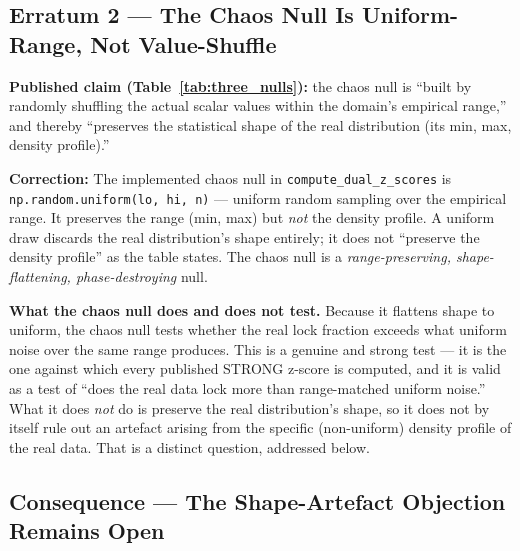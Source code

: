 \documentclass[11pt, letterpaper, openany]{book}
\begin{document}
\subsection*{Erratum 2 --- The Chaos Null Is Uniform-Range, Not Value-Shuffle}
 
\begin{warningbox}
\textbf{Published claim (Table~\ref{tab:three_nulls}):} the chaos null is ``built by
randomly shuffling the actual scalar values within the domain's empirical range,''
and thereby ``preserves the statistical shape of the real distribution (its min, max,
density profile).''
 
\textbf{Correction:} The implemented chaos null in \texttt{compute\_dual\_z\_scores}
is \texttt{np.random.uniform(lo, hi, n)} --- uniform random sampling over the
empirical range. It preserves the range (min, max) but \emph{not} the density
profile. A uniform draw discards the real distribution's shape entirely; it does not
``preserve the density profile'' as the table states. The chaos null is a
\emph{range-preserving, shape-flattening, phase-destroying} null.
\end{warningbox}
 
\begin{empiricalbox}
\textbf{What the chaos null does and does not test.} Because it flattens shape to
uniform, the chaos null tests whether the real lock fraction exceeds what uniform
noise over the same range produces. This is a genuine and strong test --- it is the
one against which every published STRONG z-score is computed, and it is valid as a
test of ``does the real data lock more than range-matched uniform noise.'' What it
does \emph{not} do is preserve the real distribution's shape, so it does not by
itself rule out an artefact arising from the specific (non-uniform) density profile
of the real data. That is a distinct question, addressed below.
\end{empiricalbox}
 
\subsection*{Consequence --- The Shape-Artefact Objection Remains Open}
 
\end{document}
